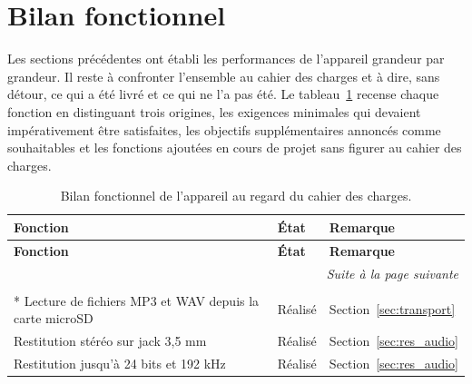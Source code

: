 \section{Bilan fonctionnel}
\label{sec:res_bilan}

Les sections précédentes ont établi les performances de l'appareil grandeur par grandeur. Il reste à confronter l'ensemble au cahier des charges et à dire, sans détour, ce qui a été livré et ce qui ne l'a pas été. Le tableau~\ref{tab:bilan} recense chaque fonction en distinguant trois origines, les exigences minimales qui devaient impérativement être satisfaites, les objectifs supplémentaires annoncés comme souhaitables et les fonctions ajoutées en cours de projet sans figurer au cahier des charges.

\begingroup
\renewcommand{\arraystretch}{1.25}
\footnotesize
\begin{longtable}{p{} p{} p{}}
  \caption{Bilan fonctionnel de l'appareil au regard du cahier des charges.}
  \label{tab:bilan}                                                                                                                                          \\
  \hline
  \textbf{Fonction}                                                                   & \textbf{État} & \textbf{Remarque}                                    \\
  \hline
  \endfirsthead
  \hline
  \textbf{Fonction}                                                                   & \textbf{État} & \textbf{Remarque}                                    \\
  \hline
  \endhead
  \hline
  \multicolumn{3}{r}{\itshape Suite à la page suivante}                                                                                                      \\
  \endfoot
  \hline
  \endlastfoot
  \multicolumn{3}{c}{\textbf{Exigences minimales}}                                                                                                           \\*
  \hline
  Lecture de fichiers MP3 et WAV depuis la carte microSD                              & Réalisé       & Section~\ref{sec:transport}                          \\
  Restitution stéréo sur jack 3,5 mm                                                  & Réalisé       & Section~\ref{sec:res_audio}                          \\
  Restitution jusqu'à 24 bits et 192 kHz                                              & Réalisé       & Section~\ref{sec:res_audio}                          \\

\end{longtable}
